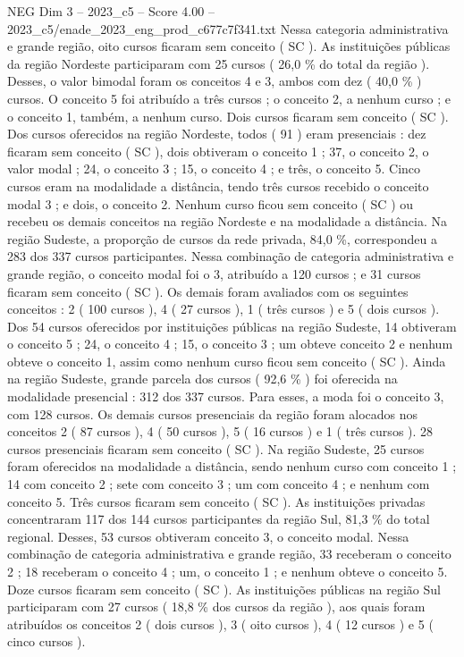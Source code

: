 \begin{textsample}{NEG Dim 3 – 2023\_c5 – Score 4.00 – 2023\_c5/enade\_2023\_eng\_prod\_c677c7f341.txt}
Nessa categoria administrativa e grande região, oito cursos ficaram sem conceito ( SC ).
As instituições públicas da região Nordeste participaram com 25 cursos ( 26,0 \% do total da região ).
Desses, o valor bimodal foram os conceitos 4 e 3, ambos com dez ( 40,0 \% ) cursos.
O conceito 5 foi atribuído a três cursos ; o conceito 2, a nenhum curso ; e o conceito 1, também, a nenhum curso.
Dois cursos ficaram sem conceito ( SC ).
Dos cursos oferecidos na região Nordeste, todos ( 91 ) eram presenciais : dez ficaram sem conceito ( SC ), dois obtiveram o conceito 1 ; 37, o conceito 2, o valor modal ; 24, o conceito 3 ; 15, o conceito 4 ; e três, o conceito 5.
Cinco cursos eram na modalidade a distância, tendo três cursos recebido o conceito modal 3 ; e dois, o conceito 2.
Nenhum curso ficou sem conceito ( SC ) ou recebeu os demais conceitos na região Nordeste e na modalidade a distância.
Na região Sudeste, a proporção de cursos da rede privada, 84,0 \%, correspondeu a 283 dos 337 cursos participantes.
Nessa combinação de categoria administrativa e grande região, o conceito modal foi o 3, atribuído a 120 cursos ; e 31 cursos ficaram sem conceito ( SC ).
Os demais foram avaliados com os seguintes conceitos : 2 ( 100 cursos ), 4 ( 27 cursos ), 1 ( três cursos ) e 5 ( dois cursos ).
Dos 54 cursos oferecidos por instituições públicas na região Sudeste, 14 obtiveram o conceito 5 ; 24, o conceito 4 ; 15, o conceito 3 ; um obteve conceito 2 e nenhum obteve o conceito 1, assim como nenhum curso ficou sem conceito ( SC ).
Ainda na região Sudeste, grande parcela dos cursos ( 92,6 \% ) foi oferecida na modalidade presencial : 312 dos 337 cursos.
Para esses, a moda foi o conceito 3, com 128 cursos.
Os demais cursos presenciais da região foram alocados nos conceitos 2 ( 87 cursos ), 4 ( 50 cursos ), 5 ( 16 cursos ) e 1 ( três cursos ). 28 cursos presenciais ficaram sem conceito ( SC ).
Na região Sudeste, 25 cursos foram oferecidos na modalidade a distância, sendo nenhum curso com conceito 1 ; 14 com conceito 2 ; sete com conceito 3 ; um com conceito 4 ; e nenhum com conceito 5.
Três cursos ficaram sem conceito ( SC ).
As instituições privadas concentraram 117 dos 144 cursos participantes da região Sul, 81,3 \% do total regional.
Desses, 53 cursos obtiveram conceito 3, o conceito modal.
Nessa combinação de categoria administrativa e grande região, 33 receberam o conceito 2 ; 18 receberam o conceito 4 ; um, o conceito 1 ; e nenhum obteve o conceito 5.
Doze cursos ficaram sem conceito ( SC ).
As instituições públicas na região Sul participaram com 27 cursos ( 18,8 \% dos cursos da região ), aos quais foram atribuídos os conceitos 2 ( dois cursos ), 3 ( oito cursos ), 4 ( 12 cursos ) e 5 ( cinco cursos ).

\end{textsample}
